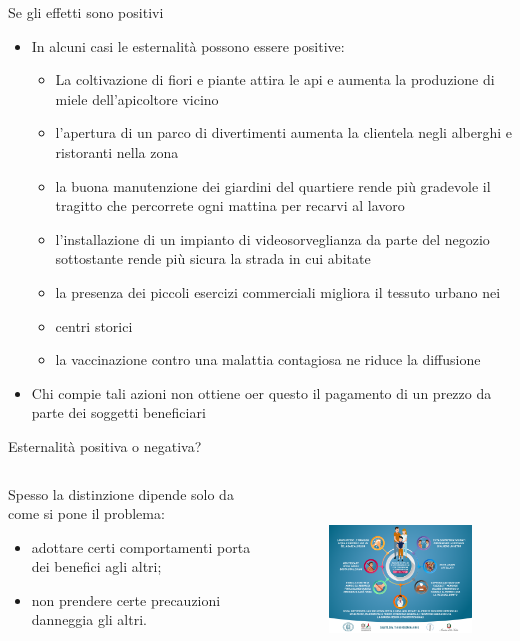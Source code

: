 \documentclass[aspectratio=64,11pt]{beamer}
\begin{document}
\begin{frame}{Se gli effetti sono positivi}
\begin{itemize}
\item In alcuni casi le esternalità possono essere positive:
\begin{itemize}
\item La coltivazione di fiori e piante attira le api e aumenta la produzione di
miele dell’apicoltore vicino
\item l’apertura di un parco di divertimenti aumenta la clientela negli alberghi
e ristoranti nella zona
\item la buona manutenzione dei giardini del quartiere rende più gradevole il
tragitto che percorrete ogni mattina per recarvi al lavoro
\item l’installazione di un impianto di videosorveglianza da parte del negozio
sottostante rende più sicura la strada in cui abitate
\item la presenza dei piccoli esercizi commerciali migliora il tessuto urbano
nei
\item centri storici
\item la vaccinazione contro una malattia contagiosa ne riduce la diffusione
\end{itemize}
\item Chi compie tali azioni non ottiene oer questo il pagamento di un prezzo da
parte dei soggetti beneficiari
\end{itemize}
\end{frame}

\begin{frame}{Esternalità positiva o negativa?}
\begin{columns}
\begin{column}{.4\columnwidth}
Spesso la distinzione dipende solo da come si pone il problema:
\begin{itemize}
\item adottare certi comportamenti porta dei benefici agli altri;
\item non prendere certe precauzioni danneggia gli altri.
\end{itemize}
\end{column}

\begin{column}{.6\columnwidth}
\begin{figure}[htbp]
\centering
\includegraphics[height=5cm]{./figure/locandina-corona.png}
\end{figure}
\end{column}
\end{columns}
\end{frame}
\end{document}

